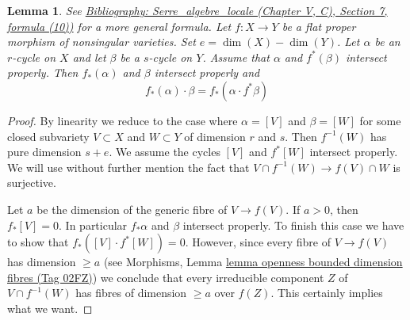 \documentclass{amsart}
\newenvironment{reference}{\comment}{\endcomment}
\theoremstyle{plain}
\newtheorem{lemma}[subsection]{Lemma}
\theoremstyle{definition}
\theoremstyle{remark}
\numberwithin{equation}{subsection}
\begin{document}
\begin{lemma}
\label{lemma-projection-formula-flat}
\begin{reference}
See \href{https://stacks.math.columbia.edu/bibliography}{Bibliography: Serre\_algebre\_locale (Chapter V, C), Section 7, formula (10))}
for a more general formula.
\end{reference}
Let $f : X \to Y$ be a flat proper morphism of nonsingular varieties.
Set $e = \dim(X) - \dim(Y)$. Let $\alpha$ be an $r$-cycle on $X$ and let
$\beta$ be a $s$-cycle on $Y$. Assume that $\alpha$ and $f^*(\beta)$ intersect
properly. Then $f_*(\alpha)$ and $\beta$ intersect properly and
$$
f_*(\alpha) \cdot \beta = f_*( \alpha \cdot f^*\beta)
$$
\end{lemma}

\begin{proof}
By linearity we reduce to the case where $\alpha = [V]$ and
$\beta = [W]$ for some closed subvariety $V \subset X$ and
$W \subset Y$ of dimension $r$ and $s$. Then $f^{-1}(W)$ has
pure dimension $s + e$. We assume the cycles
$[V]$ and $f^*[W]$ intersect properly. We will use without
further mention the fact that $V \cap f^{-1}(W) \to f(V) \cap W$
is surjective.

\medskip\noindent
Let $a$ be the dimension of the generic fibre of $V \to f(V)$.
If $a > 0$, then $f_*[V] = 0$. In particular $f_*\alpha$ and $\beta$
intersect properly. To finish this case we have to show that
$f_*([V] \cdot f^*[W]) = 0$. However, since every fibre of
$V \to f(V)$ has dimension $\geq a$ (see
Morphisms, Lemma \href{https://stacks.math.columbia.edu/tag/02FZ}{lemma openness bounded dimension fibres (Tag 02FZ)})
we conclude that every irreducible component $Z$ of $V \cap f^{-1}(W)$
has fibres of dimension $\geq a$ over $f(Z)$. This certainly
implies what we want.


\end{proof}
\end{document}
